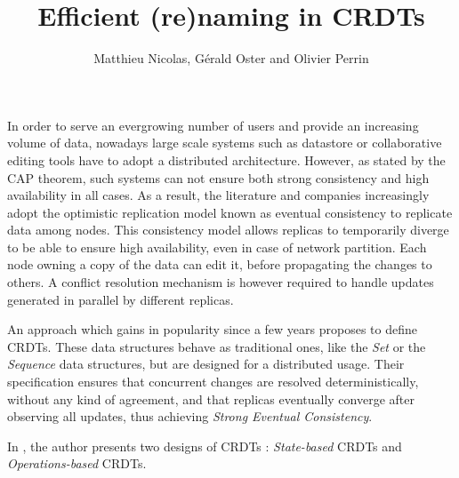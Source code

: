 \documentclass{article}
\title{Efficient (re)naming in \acp{CRDT}}
\author{Matthieu Nicolas, Gérald Oster and Olivier Perrin}
\begin{document}
\maketitle
\thispagestyle{empty}


In order to serve an evergrowing number of users and provide an increasing volume of data,
nowadays large scale systems such as datastore\cite{Antidote} or collaborative editing tools\cite{nicolas:hal-01655438} have to adopt a distributed architecture.
However, as stated by the CAP theorem\cite{BrewerPoDC2000}, such systems can not ensure both strong consistency and high availability in all cases.
As a result, the literature and companies increasingly adopt the optimistic replication model known as eventual consistency to replicate data among nodes.
This consistency model allows replicas to temporarily diverge to be able to ensure high availability, even in case of network partition.
Each node owning a copy of the data can edit it, before propagating the changes to others.
A conflict resolution mechanism is however required to handle updates generated in parallel by different replicas.


An approach which gains in popularity since a few years proposes to define \acfp{CRDT}\cite{shapiro:inria-00555588}.
These data structures behave as traditional ones, like the \emph{Set} or the \emph{Sequence} data structures, but are designed for a distributed usage.
Their specification ensures that concurrent changes are resolved deterministically, without any kind of agreement, and that replicas eventually converge after observing all updates,
thus achieving \emph{Strong Eventual Consistency}.

In \cite{shapiro:inria-00555588}, the author presents two designs of \acp{CRDT} :
\emph{State-based} \acp{CRDT} and \emph{Operations-based} \acp{CRDT}.

\end{document}
